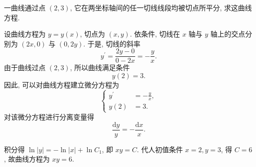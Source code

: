 \documentclass[answer]{THUExam}
\begin{document}
\begin{problem}
一曲线通过点 $(2,3)$, 它在两坐标轴间的任一切线线段均被切点所平分, 求这曲线方程.
\end{problem}
\begin{solution}
    设曲线方程为 $y=y(x)$, 切点为 $(x, y)$. 依条件, 切线在 $x$ 轴与 $y$ 轴上的交点分别为 $(2 x,0)$ 与 $(0,2 y)$. 于是, 切线的斜率
    $$
        y^{\prime}=\frac{2 y-0}{0-2 x}=-\frac{y}{x} .
    $$
    由于曲线过点 $(2,3)$, 所以曲线满足条件
    $$
        y(2)=3.
    $$
    因此, 可以对曲线方程建立微分方程为
    $$
        \left\{
        \begin{aligned}
            y^{\prime} & =-\frac{y}{x}, \\
            y(2)       & =3.
        \end{aligned}
        \right.
    $$
    对该微分方程进行分离变量得
    $$
        \frac{\mathrm{d} y}{y}=-\frac{\mathrm{d} x}{x} .
    $$

    积分得 $\ln |y|=-\ln |x|+\ln C_1$, 即 $x y=C$. 代人初值条件 $x=2, y=3$, 得 $C=6$, 故曲线方程为 $x y=6$.
\end{solution}
\end{document}
